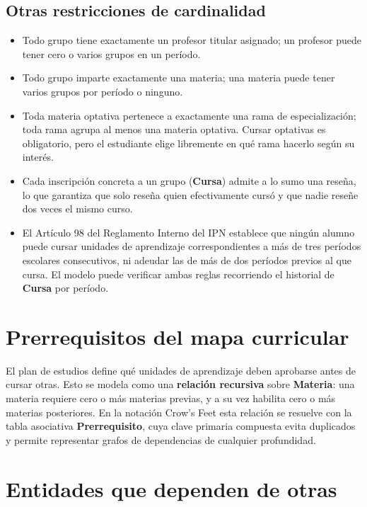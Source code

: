 \documentclass[11pt,letterpaper]{article}
\begin{document}
\subsection{Otras restricciones de cardinalidad}

\begin{itemize}
  \item Todo grupo tiene exactamente un profesor titular asignado; un profesor puede tener cero o varios grupos en un período.
  \item Todo grupo imparte exactamente una materia; una materia puede tener varios grupos por período o ninguno.
  \item Toda materia optativa pertenece a exactamente una rama de especialización; toda rama agrupa al menos una materia optativa. Cursar optativas es obligatorio, pero el estudiante elige libremente en qué rama hacerlo según su interés.
  \item Cada inscripción concreta a un grupo (\textbf{Cursa}) admite a lo sumo una reseña, lo que garantiza que solo reseña quien efectivamente cursó y que nadie reseñe dos veces el mismo curso.
  \item El Artículo 98 del Reglamento Interno del IPN establece que ningún alumno puede cursar unidades de aprendizaje correspondientes a más de tres períodos escolares consecutivos, ni adeudar las de más de dos períodos previos al que cursa. El modelo puede verificar ambas reglas recorriendo el historial de \textbf{Cursa} por período.
\end{itemize}

\section{Prerrequisitos del mapa curricular}

El plan de estudios define qué unidades de aprendizaje deben aprobarse antes de cursar otras. Esto se modela como una \textbf{relación recursiva} sobre \textbf{Materia}: una materia requiere cero o más materias previas, y a su vez habilita cero o más materias posteriores. En la notación Crow's Feet esta relación se resuelve con la tabla asociativa \textbf{Prerrequisito}, cuya clave primaria compuesta evita duplicados y permite representar grafos de dependencias de cualquier profundidad.

\section{Entidades que dependen de otras}
\end{document}
